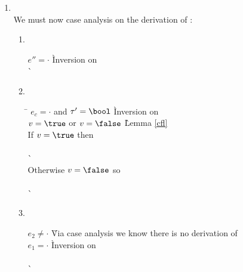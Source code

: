 \begin{enumerate}
\begin{enumerate}
\begin{enumerate}
    \item {} \ \\
      We must now case analysis on the derivation of :
      \begin{enumerate}

      \item {} \ \\
        \begin{tabbing}
        $e'' = \cdot$
          \` Inversion on  \\
          \`  \\
        \end{tabbing}

      \item {} \ \\
        \begin{tabbing}
        \hspace{1em} \= \kill
        $e_c = \cdot$ and $\tau' = \bool$
          \` Inversion on  \\
        $v = \true$ or $v = \false$
          \` Lemma \ref{cfl} \\
        If $v = \true$ then \+ \\
           \\
            \`  \- \\
        Otherwise $v = \false$ so \+ \\
           \\
            \`  \- \\
        \end{tabbing}

      \item {} \ \\

        \begin{tabbing}
        $e_2 \not= \cdot$
          \` Via case analysis we know there is no derivation of  \\
        $e_1 = \cdot$
          \` Inversion on  \\
         \\
          \`  \\
        \end{tabbing}


\end{enumerate}
\end{enumerate}
\end{enumerate}
\end{enumerate}
